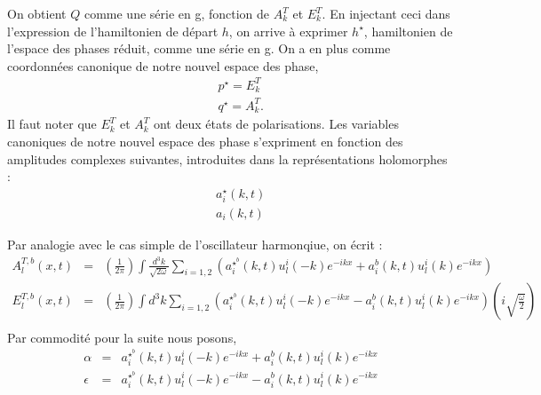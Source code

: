 \documentclass[a4paper,11pt]{article}
\theoremstyle{plain}
\theoremstyle{definition}
\theoremstyle{remark}
\numberwithin{equation}{section}
\numberwithin{equation}{subsection}
\numberwithin{figure}{section}
\begin{document}
On obtient $Q$ comme une série en g, fonction de $A^{T}_{k}$ et $E_{k}^{T}$. En injectant ceci dans l'expression de l'hamiltonien de départ $h$, 
on arrive à exprimer $h^{\star}$, hamiltonien de l'espace des phases réduit, comme une série en g.
On a en plus comme coordonnées canonique de notre nouvel espace des phase, 
\begin{eqnarray}
 && p^{\star} = E_{k}^{T} \\
 && q^{\star} = A_{k}^{T}.
\end{eqnarray}
Il faut noter que $E_{k}^{T}$ et $A_{k}^{T}$ ont deux états de polarisations.
Les variables canoniques de notre nouvel espace des phase s'expriment en fonction des amplitudes complexes suivantes, introduites dans la 
représentations holomorphes :
\begin{eqnarray}
 &&a^{\star}_{i}(k,t)\\
 &&a_{i}(k,t)
\end{eqnarray}

\noindent
Par analogie avec le cas simple de l'oscillateur harmonqiue, on écrit  :
\begin{eqnarray}
 A^{T,b}_{l} (x,t) &=& \left( \frac{1}{2 \pi} \right)  \int \frac{ d^{3}k }{ \sqrt{2 \omega} } 
\sum_{i=1,2} \left(  a^{\star^{b}}_{i}(k,t) u^{i}_{l}(-k) e^{-ikx}  +   a^{b}_{i}(k,t) u^{i}_{l}(k) e^{-ikx}  \right)\\
 E^{T,b}_{l} (x,t) &=& \left( \frac{1}{2 \pi} \right)  \int d^{3}k 
\sum_{i=1,2} \left(  a^{\star^{b}}_{i}(k,t) u^{i}_{l}(-k) e^{-ikx}  -   a^{b}_{i}(k,t) u^{i}_{l}(k) e^{-ikx}  \right) 
\left(i \sqrt{\frac{\omega}{2}} \right) \nonumber \\
\end{eqnarray}
Par commodité pour la suite nous posons,
\begin{eqnarray}
 \alpha &=& a^{\star^{b}}_{i}(k,t) u^{i}_{l}(-k) e^{-ikx}  +   a^{b}_{i}(k,t) u^{i}_{l}(k) e^{-ikx}\\
 \epsilon &=& a^{\star^{b}}_{i}(k,t) u^{i}_{l}(-k) e^{-ikx}  -   a^{b}_{i}(k,t) u^{i}_{l}(k) e^{-ikx}
\end{eqnarray}
\end{document}
